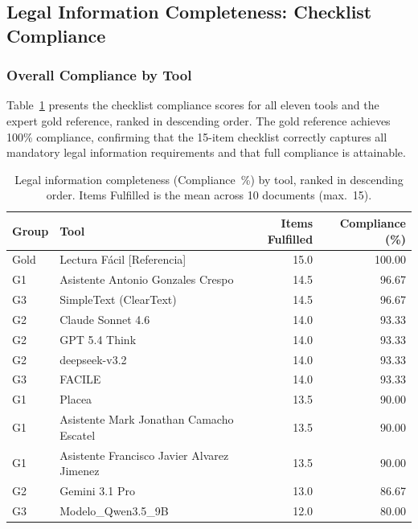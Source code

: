 \documentclass[12pt, a4paper]{article}
\begin{document}
\subsection{Legal Information Completeness: Checklist Compliance}
\label{ssec:checklist-results}

\subsubsection{Overall Compliance by Tool}
\label{sssec:compliance-overall}

Table~\ref{tab:compliance} presents the checklist compliance scores for all eleven tools
and the expert gold reference, ranked in descending order. The gold reference achieves
100\% compliance, confirming that the 15-item checklist correctly captures all mandatory
legal information requirements and that full compliance is attainable.

\begin{table}[ht]
\centering
\caption{Legal information completeness (Compliance~\%) by tool, ranked in descending
         order. Items Fulfilled is the mean across 10 documents (max.~15).}
\label{tab:compliance}
\begin{tabular}{@{} l l r r @{}}
\toprule
\textbf{Group} & \textbf{Tool} & \textbf{Items Fulfilled} & \textbf{Compliance (\%)} \\
\midrule
Gold & Lectura Fácil [Referencia]                     & 15.0 & 100.00 \\
G1   & Asistente Antonio Gonzales Crespo              & 14.5 &  96.67 \\
G3   & SimpleText (ClearText)                         & 14.5 &  96.67 \\
G2   & Claude Sonnet 4.6                              & 14.0 &  93.33 \\
G2   & GPT 5.4 Think                                  & 14.0 &  93.33 \\
G2   & deepseek-v3.2                                  & 14.0 &  93.33 \\
G3   & FACILE                                         & 14.0 &  93.33 \\
G1   & Placea                                         & 13.5 &  90.00 \\
G1   & Asistente Mark Jonathan Camacho Escatel        & 13.5 &  90.00 \\
G1   & Asistente Francisco Javier Alvarez Jimenez     & 13.5 &  90.00 \\
G2   & Gemini 3.1 Pro                                 & 13.0 &  86.67 \\
G3   & Modelo\_Qwen3.5\_9B                            & 12.0 &  80.00 \\
\bottomrule
\end{tabular}
\end{table}
\end{document}
